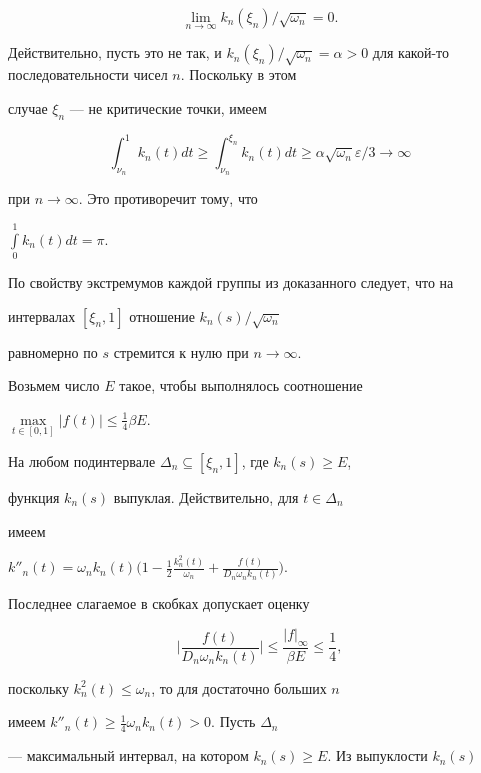 \begin{pf}
$$


\lim_{n\to \infty}{k_n(\xi_n)/\sqrt{\omega_n}}=0.


$$


Действительно, пусть это не так, и $k_n(\xi_n)/\sqrt{\omega_n}=


\alpha >0$ для какой-то последовательности чисел $n$. Поскольку в этом


случае $\xi_n$ --- не критические точки, имеем


$$


\int_{\nu_n}^{1} k_n(t) dt \ge \int_{\nu_n}^{\xi_n} k_n(t) dt \ge


\alpha \sqrt{\omega_n} \varepsilon /3 \to \infty


$$


при $n\to \infty$. Это противоречит тому, что


$\int \limits_{0}^{1} k_n(t) dt=\pi$.


По свойству экстремумов каждой группы из доказанного следует, что на


интервалах $[\xi_n, 1]$ отношение $k_n(s)/ \sqrt{\omega_n}$


равномерно по $s$ стремится к нулю при $n\rightarrow \infty$.





Возьмем число $E$ такое, чтобы выполнялось соотношение


$\max\limits_{t\in [0,1]}| f(t)|\le\frac{1}{4}\beta E$.


На любом подинтервале $\Delta_n \subseteq [\xi_n, 1] $, где $k_n(s) \ge E$,


функция $ k_n(s)$ выпуклая. Действительно, для $t \in \Delta_n$


имеем


$k''_n(t)=\omega_n k_n(t) \big(1-\frac{1}{2}\frac{k_n^2(t)}{\omega_n}+


\frac{f(t)}{D_n \omega_n k_n(t)}\big)$.


Последнее слагаемое в скобках допускает оценку


$$


\bigg|\frac{f(t)}{D_n \omega_n k_n(t)}\bigg|\le


\frac{|f|_\infty}{\beta E}\le \frac{1}{4},


$$


поскольку $k_n^2(t) \le \omega_n$, то для достаточно больших $n$


имеем $k''_n(t) \ge \frac{1}{4}\omega_n k_n(t) >0$. Пусть $\Delta_n$


--- максимальный интервал, на котором $k_n(s) \ge E$. Из выпуклости $k_n(s)$



\end{pf}
